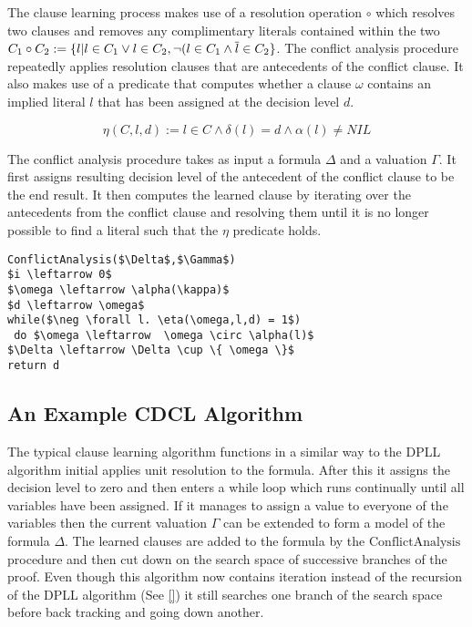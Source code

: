 The clause learning process makes use of a resolution operation $\circ$ which resolves two clauses and removes any complimentary literals contained within the two $C_1 \circ C_2 := \{l | l \in C_1 \vee l \in C_2, \neg (l \in C_1 \wedge \overline{l} \in C_2 \}$. The conflict analysis procedure repeatedly applies resolution clauses that are antecedents of the conflict clause. It also makes use of a predicate that computes whether a clause $\omega$ contains an implied literal $l$ that has been assigned at the decision level $d$.

$$\eta(C,l,d) := l \in C \wedge \delta(l) = d \wedge \alpha(l) \neq NIL$$

The conflict analysis procedure takes as input a formula $\Delta$ and a valuation $\Gamma$. It first assigns resulting decision level of the antecedent of the conflict clause to be the end result. It then computes the learned clause by iterating over the antecedents from the conflict clause and resolving them until it is no longer possible to find a literal such that the $\eta$ predicate holds.

\begin{lstlisting}[caption = Conflict Analysis Procedure, mathescape]
ConflictAnalysis($\Delta$,$\Gamma$) 
$i \leftarrow 0$
$\omega \leftarrow \alpha(\kappa)$
$d \leftarrow \omega$
while($\neg \forall l. \eta(\omega,l,d) = 1$)
 do $\omega \leftarrow  \omega \circ \alpha(l)$
$\Delta \leftarrow \Delta \cup \{ \omega \}$
return d
\end{lstlisting}



\subsection*{An Example CDCL Algorithm}

The typical clause learning algorithm functions in a similar way to the DPLL algorithm initial applies unit resolution to the formula. After this it assigns the decision level to zero and then enters a while loop which runs continually until all variables have been assigned. If it manages to assign a value to everyone of the variables then the current valuation $\Gamma$ can be extended to form a model of the formula $\Delta$. The learned clauses are added to the formula by the $\mathrm{ConflictAnalysis}$ procedure and then cut down on the search space of successive branches of the proof. Even though this algorithm now contains iteration instead of the recursion of the DPLL algorithm (See \ref{})  it still searches one branch of the search space before back tracking and going down another.




